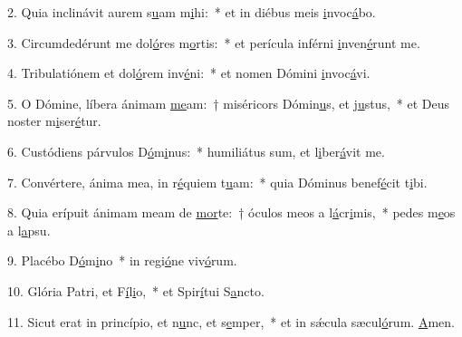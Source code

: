 2. Quia inclinávit aurem s\uline{u}am m\uline{i}hi:~* et in diébus meis \uline{i}nvoc\uline{á}bo.\par 
3. Circumdedérunt me dol\uline{ó}res m\uline{o}rtis:~* et perícula inférni \uline{i}nven\uline{é}runt me.\par 
4. Tribulatiónem et dol\uline{ó}rem inv\uline{é}ni:~* et nomen Dómini \uline{i}nvoc\uline{á}vi.\par 
5. O Dómine, líbera ánimam \uline{me}am:~† miséricors Dómin\uline{u}s, et j\uline{u}stus,~* et Deus noster m\uline{i}ser\uline{é}tur.\par 
6. Custódiens párvulos D\uline{ó}m\uline{i}nus:~* humiliátus sum, et l\uline{i}ber\uline{á}vit me.\par 
7. Convértere, ánima mea, in r\uline{é}quiem t\uline{u}am:~* quia Dóminus benef\uline{é}cit t\uline{i}bi.\par 
8. Quia erípuit ánimam meam de \uline{mor}te:~† óculos meos a l\uline{á}cr\uline{i}mis,~* pedes m\uline{e}os a l\uline{a}psu.\par 
9. Placébo D\uline{ó}m\uline{i}no~* in regi\uline{ó}ne viv\uline{ó}rum.\par 
10. Glória Patri, et F\uline{í}l\uline{i}o,~* et Spir\uline{í}tui S\uline{a}ncto.\par 
11. Sicut erat in princípio, et n\uline{u}nc, et s\uline{e}mper,~* et in sǽcula sæcul\uline{ó}rum. \uline{A}men.\par 
